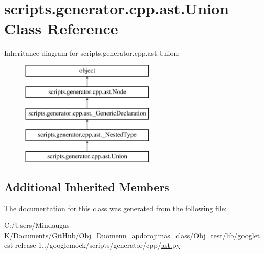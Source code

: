 \hypertarget{classscripts_1_1generator_1_1cpp_1_1ast_1_1_union}{}\section{scripts.\+generator.\+cpp.\+ast.\+Union Class Reference}
\label{classscripts_1_1generator_1_1cpp_1_1ast_1_1_union}
Inheritance diagram for scripts.\+generator.\+cpp.\+ast.\+Union\+:\begin{figure}[H]
\begin{center}
\leavevmode
\includegraphics[height=5.000000cm]{dd/d8a/classscripts_1_1generator_1_1cpp_1_1ast_1_1_union}
\end{center}
\end{figure}
\subsection*{Additional Inherited Members}


The documentation for this class was generated from the following file\+:\begin{DoxyCompactItemize}
\item 
C\+:/\+Users/\+Mindaugas K/\+Documents/\+Git\+Hub/\+Obj\+\_\+\+Duomenu\+\_\+apdorojimas\+\_\+class/\+Obj\+\_\+test/lib/googletest-\/release-\/1../googlemock/scripts/generator/cpp/\mbox{\hyperlink{_obj__test_2lib_2googletest-release-1_88_81_2googlemock_2scripts_2generator_2cpp_2ast_8py}{ast.\+py}}\end{DoxyCompactItemize}
